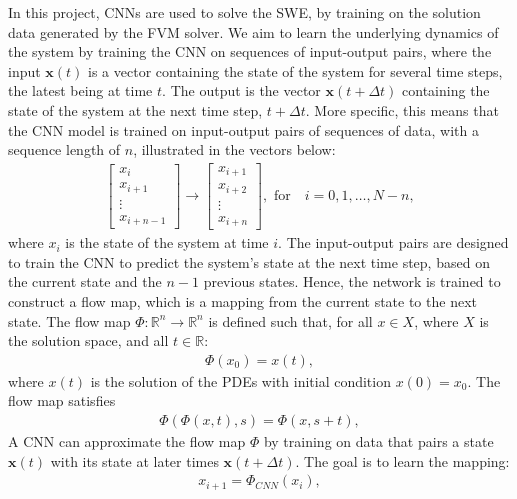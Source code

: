 In this project, CNNs are used to solve the SWE, by training on the solution data generated by the FVM solver.
We aim to learn the underlying dynamics of the system by training the CNN on sequences of input-output pairs, where the input $\mathbf{x}(t)$ is a vector containing the state of the system for several time steps, the latest being at time $t$.
The output is the vector $\mathbf{x}(t + \Delta t)$ containing the state of the system at the next time step, $t + \Delta t$.
More specific, this means that the CNN model is trained on input-output pairs of sequences of data, with a sequence length of $n$, illustrated in the vectors below:
\begin{align*}
    \begin{bmatrix}
        x_i \\ x_{i+1} \\ \vdots \\ x_{i+n-1}
    \end{bmatrix}
    \to
    \begin{bmatrix}
        x_{i+1} \\ x_{i+2} \\ \vdots \\ x_{i+n}
    \end{bmatrix},
    \text{ for} \quad i = 0, 1, \ldots, N-n,
\end{align*}
where $x_i$ is the state of the system at time $i$.
The input-output pairs are designed to train the CNN to predict the system's state at the next time step, based on the current state and the $n-1$ previous states.
Hence, the network is trained to construct a flow map, which is a mapping from the current state to the next state.
The flow map $\Phi: \mathbb{R}^n \rightarrow \mathbb{R}^n$ is defined such that, for all $x \in X$, where $X$ is the solution space, and all $t \in \mathbb{R}$:
\begin{align*}
    \Phi(x_0) =  x(t),
\end{align*}
where $x(t)$ is the solution of the PDEs with initial condition $x(0) = x_0$.
The flow map satisfies
\begin{align*}
    \Phi(\Phi (x, t), s) = \Phi(x, s + t),
\end{align*}
A CNN can approximate the flow map $\Phi$ by training on data that pairs a state $\mathbf{x}(t)$ with its state at later times $\mathbf{x}(t + \Delta t)$.
The goal is to learn the mapping:
\begin{align*}
    x_{i+1} = \Phi_{CNN} (x_i), 
\end{align*}
